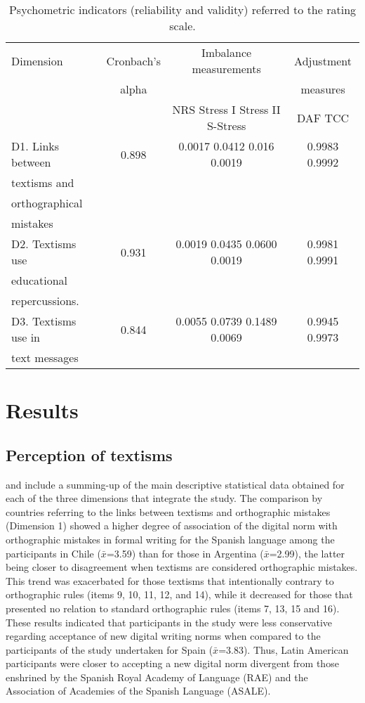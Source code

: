 \documentclass{textolivre}
\begin{document}
\begin{table}[htpb]
\caption{Psychometric indicators (reliability and validity) referred to the rating scale.}
\label{tbl-tabela-02}
\centering
\begin{tabular}{lccc}
\toprule 
Dimension & Cronbach's & Imbalance measurements & Adjustment \\
& alpha & & measures\\
\midrule
& & NRS   Stress I Stress II S-Stress & DAF TCC\\
D1. Links between & 0.898 & 0.0017	0.0412	0.016	0.0019	& 0.9983	0.9992\\
textisms and \\
orthographical \\
mistakes\\
D2. Textisms use & 0.931 & 0.0019	0.0435	0.0600	0.0019	& 0.9981	0.9991\\
educational \\
repercussions.\\
D3. Textisms use in & 0.844 & 0.0055	0.0739	0.1489	0.0069	& 0.9945	0.9973\\ 
text messages\\
\bottomrule
\end{tabular}
\end{table}

\section{Results}

\subsection{Perception of textisms}
 and  include a summing-up of the main descriptive statistical data obtained for each of the three dimensions that integrate the study. The comparison by countries referring to the links between textisms and orthographic mistakes (Dimension 1) showed a higher degree of association of the digital norm with orthographic mistakes in formal writing for the Spanish language among the participants in Chile ($\bar{x}$=3.59) than for those in Argentina ($\bar{x}$=2.99), the latter being closer to disagreement when textisms are considered orthographic mistakes. This trend was exacerbated for those textisms that intentionally contrary to orthographic rules (items 9, 10, 11, 12, and 14), while it decreased for those that presented no relation to standard orthographic rules (items 7, 13, 15 and 16). These results indicated that participants in the study were less conservative regarding acceptance of new digital writing norms when compared to the participants of the study undertaken for Spain ($\bar{x}$=3.83). Thus, Latin American participants were closer to accepting a new digital norm divergent from those enshrined by the Spanish Royal Academy of Language (RAE) and the Association of Academies of the Spanish Language (ASALE).
\end{document}
